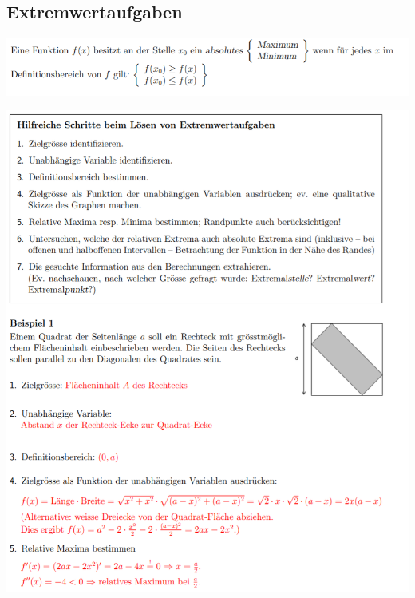 \subsection{Extremwertaufgaben}

\begin{center}
    \includegraphics[width=1\linewidth]{images/minmax.png}
\end{center}

\begin{center}
    \includegraphics[width=1\linewidth]{images/extrem.png}
\end{center}

